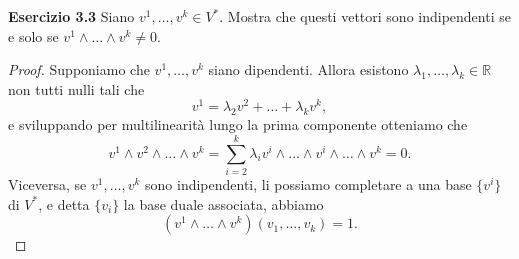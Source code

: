 \documentclass[a4paper]{article}
\newcommand{\R}{\mathbb{R}}
\theoremstyle{definition}
\theoremstyle{definition}
\theoremstyle{remark}
\theoremstyle{definition}
\begin{document}
\textbf{Esercizio 3.3}
Siano $v^1, \ldots, v^k \in V^*$. Mostra che questi vettori sono indipendenti se e solo se $v^1\wedge \ldots \wedge v^k \neq 0$.
\begin{proof}
    Supponiamo che $v^1, \ldots, v^k$ siano dipendenti. Allora esistono $\lambda_1, \ldots, \lambda_k \in \R$ non tutti nulli tali che
    \[
        v^1 = \lambda_2 v^2 + \ldots + \lambda_k v^k,
    \]
    e sviluppando per multilinearità lungo la prima componente otteniamo che
    \[
        v^1\wedge v^2 \wedge \ldots \wedge v^k =  \sum_{i=2}^k \lambda_i v^i \wedge \ldots \wedge v^i \wedge \ldots \wedge v^k = 0.
    \]
    Viceversa, se $v^1, \ldots, v^k$ sono indipendenti, li possiamo completare a una base $\{v^i\}$ di $V^*$, e detta $\{v_i\}$ la base duale associata, abbiamo
    \[
        (v^1\wedge \ldots \wedge v^k) (v_1, \ldots, v_k) = 1 .
    \]
\end{proof}
\end{document}
